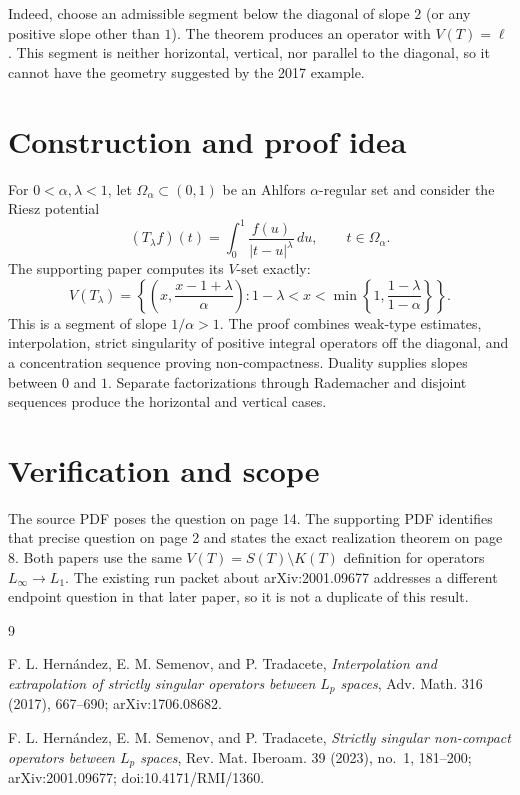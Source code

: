 \documentclass[11pt]{article}
\begin{document}
Indeed, choose an admissible segment below the diagonal of slope $2$ (or
any positive slope other than $1$).  The theorem produces an operator with
$V(T)=\ell$.  This segment is neither horizontal, vertical, nor parallel to
the diagonal, so it cannot have the geometry suggested by the 2017 example.

\section*{Construction and proof idea}

For $0<\alpha,\lambda<1$, let $\Omega_\alpha\subset(0,1)$ be an Ahlfors
$\alpha$-regular set and consider the Riesz potential
\[
 (T_\lambda f)(t)=\int_0^1\frac{f(u)}{|t-u|^\lambda}\,du,
 \qquad t\in\Omega_\alpha.
\]
The supporting paper computes its $V$-set exactly:
\[
 V(T_\lambda)=
 \left\{\left(x,\frac{x-1+\lambda}{\alpha}\right):
 1-\lambda<x<
 \min\left\{1,\frac{1-\lambda}{1-\alpha}\right\}\right\}.
\]
This is a segment of slope $1/\alpha>1$.  The proof combines weak-type
estimates, interpolation, strict singularity of positive integral operators
off the diagonal, and a concentration sequence proving non-compactness.
Duality supplies slopes between $0$ and $1$.  Separate factorizations
through Rademacher and disjoint sequences produce the horizontal and vertical
cases.

\section*{Verification and scope}

The source PDF poses the question on page 14.  The supporting PDF identifies
that precise question on page 2 and states the exact realization theorem on
page 8.  Both papers use the same $V(T)=S(T)\setminus K(T)$ definition for
operators $L_\infty\to L_1$.  The existing run packet about arXiv:2001.09677
addresses a different endpoint question in that later paper, so it is not a
duplicate of this result.

\begin{thebibliography}{9}

F. L. Hernández, E. M. Semenov, and P. Tradacete,
\emph{Interpolation and extrapolation of strictly singular operators between
$L_p$ spaces},
Adv. Math. 316 (2017), 667--690; arXiv:1706.08682.

F. L. Hernández, E. M. Semenov, and P. Tradacete,
\emph{Strictly singular non-compact operators between $L_p$ spaces},
Rev. Mat. Iberoam. 39 (2023), no.~1, 181--200;
arXiv:2001.09677; doi:10.4171/RMI/1360.

\end{thebibliography}
\end{document}
